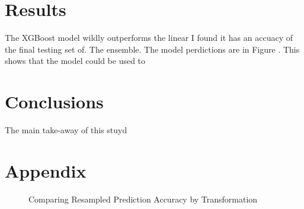 \documentclass[16pt,twocolumn,letterpaper,titlepage]{article}
\begin{document}

\section{Results}

The XGBoost model wildly outperforms the linear I found it has an accuacy of the final testing set of. The ensemble. The model perdictions are in Figure . This shows that the model could be used to 

\section{Conclusions}

The main take-away of this stuyd 

\clearpage
\onecolumn



\section{Appendix}

\begin{figure}[!htb]
	\caption{\label{fig:my-label} Comparing Resampled Prediction Accuracy by Transformation}
	
\end{figure}
\end{document}
